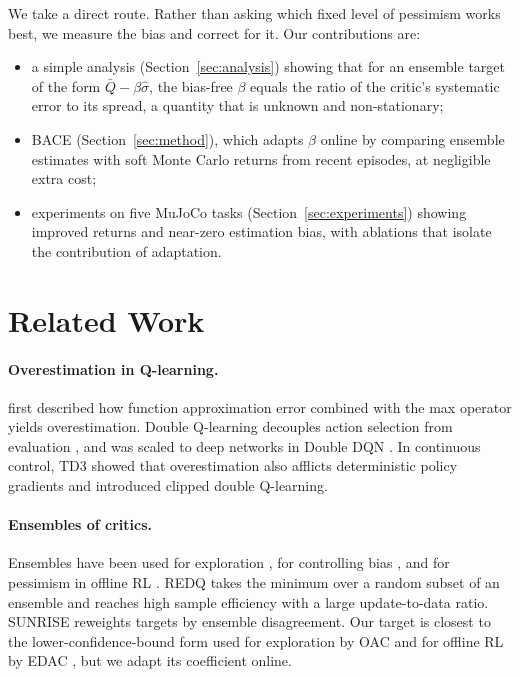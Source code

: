 \documentclass[10pt,twocolumn,letterpaper]{article}
\newcommand{\Qbar}{\bar{Q}}
\newcommand{\method}{\textsc{BACE}}
\begin{document}
We take a direct route. Rather than asking which fixed level of pessimism works best, we measure the bias and correct for it. Our contributions are:
\begin{itemize}
  \item a simple analysis (Section~\ref{sec:analysis}) showing that for an ensemble target of the form $\Qbar - \beta\hat\sigma$, the bias-free $\beta$ equals the ratio of the critic's systematic error to its spread, a quantity that is unknown and non-stationary;
  \item \method{} (Section~\ref{sec:method}), which adapts $\beta$ online by comparing ensemble estimates with soft Monte Carlo returns from recent episodes, at negligible extra cost;
  \item experiments on five MuJoCo tasks (Section~\ref{sec:experiments}) showing improved returns and near-zero estimation bias, with ablations that isolate the contribution of adaptation.
\end{itemize}

\section{Related Work}
\label{sec:related}

\paragraph{Overestimation in Q-learning.} \citet{thrun1993} first described how function approximation error combined with the max operator yields overestimation. Double Q-learning decouples action selection from evaluation \citep{vanhasselt2010}, and was scaled to deep networks in Double DQN \citep{vanhasselt2016}. In continuous control, TD3 \citep{fujimoto2018} showed that overestimation also afflicts deterministic policy gradients \citep{lillicrap2016} and introduced clipped double Q-learning.

\paragraph{Ensembles of critics.} Ensembles have been used for exploration \citep{osband2016,lee2021}, for controlling bias \citep{lan2020,chen2021}, and for pessimism in offline RL \citep{an2021}. REDQ \citep{chen2021} takes the minimum over a random subset of an ensemble and reaches high sample efficiency with a large update-to-data ratio. SUNRISE \citep{lee2021} reweights targets by ensemble disagreement. Our target is closest to the lower-confidence-bound form used for exploration by OAC \citep{ciosek2019} and for offline RL by EDAC \citep{an2021}, but we adapt its coefficient online.
\end{document}
